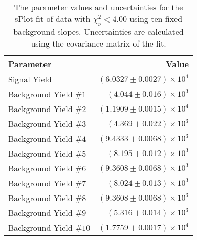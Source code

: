 
\begin{table}[ht]
    \begin{center}
        \begin{tabular}{lr}\toprule
            Parameter & Value \\\midrule
            Signal Yield & $(6.0327 \pm 0.0027) \times 10^{4}$ \\
            Background Yield $\#1$ & $(4.044 \pm 0.016) \times 10^{3}$ \\
            Background Yield $\#2$ & $(1.1909 \pm 0.0015) \times 10^{4}$ \\
            Background Yield $\#3$ & $(4.369 \pm 0.022) \times 10^{3}$ \\
            Background Yield $\#4$ & $(9.4333 \pm 0.0068) \times 10^{3}$ \\
            Background Yield $\#5$ & $(8.195 \pm 0.012) \times 10^{3}$ \\
            Background Yield $\#6$ & $(9.3608 \pm 0.0068) \times 10^{3}$ \\
            Background Yield $\#7$ & $(8.024 \pm 0.013) \times 10^{3}$ \\
            Background Yield $\#8$ & $(9.3608 \pm 0.0068) \times 10^{3}$ \\
            Background Yield $\#9$ & $(5.316 \pm 0.014) \times 10^{3}$ \\
            Background Yield $\#10$ & $(1.7759 \pm 0.0017) \times 10^{4}$ \\\bottomrule
        \end{tabular}
        \caption{The parameter values and uncertainties for the sPlot fit of data with $\chi^2_\nu < 4.00$ using ten fixed background slopes. Uncertainties are calculated using the covariance matrix of the fit.}\label{tab:splot-fit-results-chisqdof-4.00-fixed-10}
    \end{center}
\end{table}
